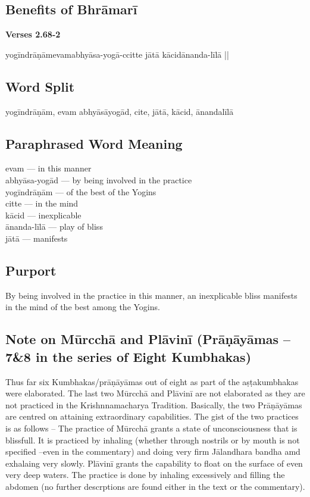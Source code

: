 \subsection*{Benefits of Bhrāmarī}


\noindent \textbf{Verses 2.68-2}

\begin{center}
yogīndrāṇāmevamabhyāsa-yogā-ccitte jātā kācidānanda-līlā ||
\end{center}

\subsection*{Word Split}


yogīndrāṇām, evam abhyāsāyogād, cite, jātā, kācid, ānandalīlā

\subsection*{Paraphrased Word Meaning}


\begin{multicols}{2}
evam --- in this manner \\
abhyāsa-yogād ---  by being involved in the practice \\
yogīndrāṇām --- of the best of the Yogins \\
citte  --- in the mind \\
kācid --- inexplicable \\
ānanda-līlā --- play of bliss \\
jātā ---  manifests
\end{multicols}

\subsection*{Purport}


By being involved in the practice in this manner, an inexplicable bliss manifests in the mind of the best among the Yogins.

\subsection*{Note on Mūrcchā and Plāvinī   (Prāṇāyāmas – 7\&8 in the series of Eight Kumbhakas)}


Thus far six Kumbhakas/prāṇāyāmas out of eight as part of the aṣṭakumbhakas were elaborated. The last two Mūrcchā  and Plāvinī are not elaborated as they are not practiced in the Krishnnamacharya Tradition. Basically, the two Prāṇāyāmas are centred on attaining extraordinary capabilities.  The gist of the two practices is as follows – The practice of Mūrcchā  grants a state of unconsciousness that is blissfull. It is practiced by inhaling (whether through nostrils or by mouth is not specified –even in the commentary) and doing very firm Jālandhara bandha amd exhalaing very slowly.  Plāvinī grants the capability to float on the surface of even very deep waters. The practice is done by inhaling excessively and filling  the abdomen (no further descrptions are found either in the text or the commentary). 
\newpage

